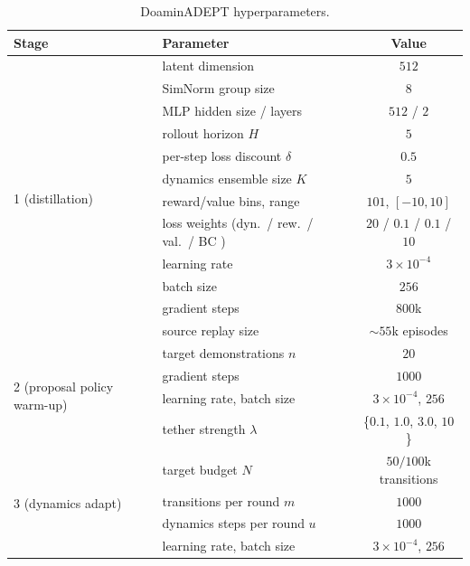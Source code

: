 \documentclass{article} %
\begin{document}
\begin{table}[h]
\centering
\caption{DoaminADEPT hyperparameters.}
\label{tab:app-hparams}
\small
\begin{tabular}{llc}
\toprule
Stage & Parameter & Value \\
\midrule
\multirow{12}{*}{1 (distillation)}
 & latent dimension & $512$ \\
 & SimNorm group size & $8$ \\
 & MLP hidden size / layers & $512$ / $2$ \\
 & rollout horizon $H$ & $5$ \\
 & per-step loss discount $\delta$ & $0.5$ \\
 & dynamics ensemble size $K$ & $5$ \\
 & reward/value bins, range & $101$, $[-10, 10]$ \\
 & loss weights (dyn.\ / rew.\ / val.\ / BC ) & $20$ / $0.1$ / $0.1$ / $10$ \\
 & learning rate & $3\times10^{-4}$ \\
 & batch size & $256$ \\
 & gradient steps & $800$k \\
 & source replay size & $\sim$$55$k episodes \\
\midrule
\multirow{4}{*}{2 (proposal policy warm-up)}
 & target demonstrations $n$ & $20$ \\
 & gradient steps & $1000$ \\
 & learning rate, batch size & $3\times10^{-4}$, $256$ \\
 & tether strength $\lambda$ & \{$0.1$, $1.0$, $3.0$, $10$\} \\
\midrule
\multirow{4}{*}{3 (dynamics adapt)}
 & target budget $N$ & $50/100$k transitions \\
 & transitions per round $m$ & $1000$ \\
 & dynamics steps per round $u$ & $1000$ \\
 & learning rate, batch size & $3\times10^{-4}$, $256$ \\
\bottomrule
\end{tabular}
\end{table}
\end{document}
